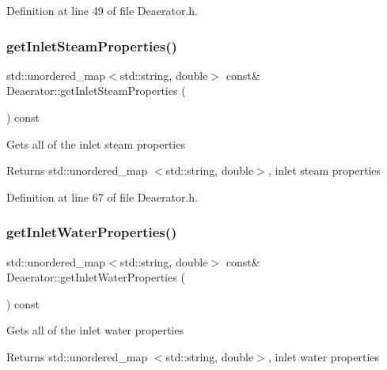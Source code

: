 Definition at line 49 of file Deaerator.\+h.

\mbox{\label{class_deaerator_ae777da23f2504f8724850946378b3cf5}} 
\subsubsection{\texorpdfstring{get\+Inlet\+Steam\+Properties()}{getInletSteamProperties()}}
{\footnotesize\ttfamily std\+::unordered\+\_\+map$<$std\+::string, double$>$ const\& Deaerator\+::get\+Inlet\+Steam\+Properties (\begin{DoxyParamCaption}{ }\end{DoxyParamCaption}) const\hspace{0.3cm}{\ttfamily [inline]}}

Gets all of the inlet steam properties \begin{DoxyReturn}{Returns}
std\+::unordered\+\_\+map $<$std\+::string, double$>$, inlet steam properties 
\end{DoxyReturn}


Definition at line 67 of file Deaerator.\+h.

\mbox{\label{class_deaerator_a6dccf8495324c76a5d9b6128c57c0427}} 
\subsubsection{\texorpdfstring{get\+Inlet\+Water\+Properties()}{getInletWaterProperties()}}
{\footnotesize\ttfamily std\+::unordered\+\_\+map$<$std\+::string, double$>$ const\& Deaerator\+::get\+Inlet\+Water\+Properties (\begin{DoxyParamCaption}{ }\end{DoxyParamCaption}) const\hspace{0.3cm}{\ttfamily [inline]}}

Gets all of the inlet water properties \begin{DoxyReturn}{Returns}
std\+::unordered\+\_\+map $<$std\+::string, double$>$, inlet water properties 
\end{DoxyReturn}


